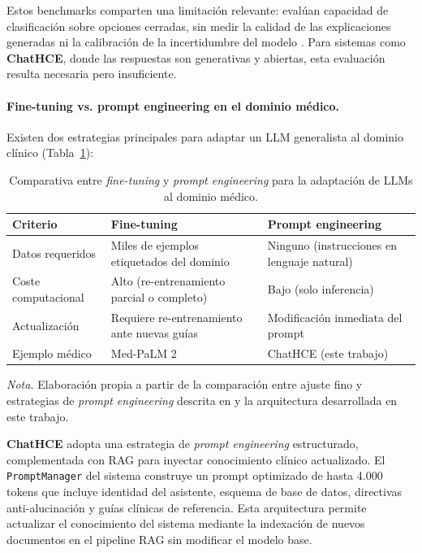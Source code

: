Estos benchmarks comparten una limitación relevante: evalúan capacidad de clasificación sobre opciones cerradas, sin medir la calidad de las explicaciones generadas ni la calibración de la incertidumbre del modelo \parencite{nori2023capabilities}. Para sistemas como \textbf{ChatHCE}, donde las respuestas son generativas y abiertas, esta evaluación resulta necesaria pero insuficiente.

\paragraph{Fine-tuning vs. prompt engineering en el dominio médico.}

Existen dos estrategias principales para adaptar un \ac{LLM} generalista al dominio clínico (Tabla~\ref{tab:finetuning-vs-prompting}):

\begin{table}[H]
\centering
\caption{Comparativa entre \textit{fine-tuning} y \textit{prompt engineering} para la adaptación de \acs{LLM}s al dominio médico.}
\label{tab:finetuning-vs-prompting}
\footnotesize
\begin{tabularx}{\columnwidth}{l>{\raggedright\arraybackslash}X>{\raggedright\arraybackslash}X}
\toprule
\textbf{Criterio} & \textbf{Fine-tuning} & \textbf{Prompt engineering} \\
\midrule
Datos requeridos & Miles de ejemplos etiquetados del dominio & Ninguno (instrucciones en lenguaje natural) \\
\addlinespace
Coste computacional & Alto (re-entrenamiento parcial o completo) & Bajo (solo inferencia) \\
\addlinespace
Actualización & Requiere re-entrenamiento ante nuevas guías & Modificación inmediata del prompt \\
\addlinespace
Ejemplo médico & Med-PaLM 2 \parencite{singhal2023} & ChatHCE (este trabajo) \\
\bottomrule
\end{tabularx}
\vspace{0.5em}
{\footnotesize\raggedright\textit{Nota.} Elaboración propia a partir de la comparación entre ajuste fino y estrategias de \textit{prompt engineering} descrita en \textcite{singhal2023} y la arquitectura desarrollada en este trabajo.\par}
\end{table}

\textbf{ChatHCE} adopta una estrategia de \textit{prompt engineering} estructurado, complementada con \ac{RAG} para inyectar conocimiento clínico actualizado. El \texttt{PromptManager} del sistema construye un prompt optimizado de hasta 4.000 tokens que incluye identidad del asistente, esquema de base de datos, directivas anti-alucinación y guías clínicas de referencia. Esta arquitectura permite actualizar el conocimiento del sistema mediante la indexación de nuevos documentos en el pipeline \ac{RAG} sin modificar el modelo base.

